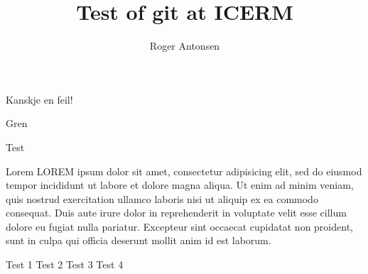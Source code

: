 \documentclass[12pt,a4paper]{article}
\author{Roger Antonsen}
\title{Test of git at ICERM}
\begin{document}
\maketitle

Kanskje en feil!

Gren

Test

Lorem LOREM ipsum dolor sit amet, consectetur adipisicing elit, sed do eiusmod tempor incididunt ut labore et dolore magna aliqua. Ut enim ad minim veniam, quis nostrud exercitation ullamco laboris nisi ut aliquip ex ea commodo consequat. Duis aute irure dolor in reprehenderit in voluptate velit esse cillum dolore eu fugiat nulla pariatur. Excepteur sint occaecat cupidatat non proident, sunt in culpa qui officia deserunt mollit anim id est laborum.

Test 1
Test 2
Test 3
Test 4
\end{document}
